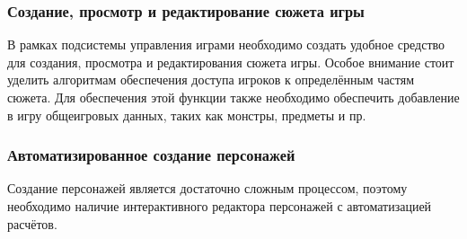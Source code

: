 \subsubsection{Создание, просмотр и редактирование сюжета игры}

В рамках подсистемы управления играми необходимо создать удобное средство для создания, просмотра и редактирования сюжета игры. Особое внимание стоит уделить алгоритмам обеспечения доступа игроков к определённым частям сюжета. Для обеспечения этой функции также необходимо обеспечить добавление в игру общеигровых данных, таких как монстры, предметы и пр.


\subsubsection{Автоматизированное создание персонажей}

Создание персонажей является достаточно сложным процессом, поэтому необходимо наличие интерактивного редактора персонажей с автоматизацией расчётов.
